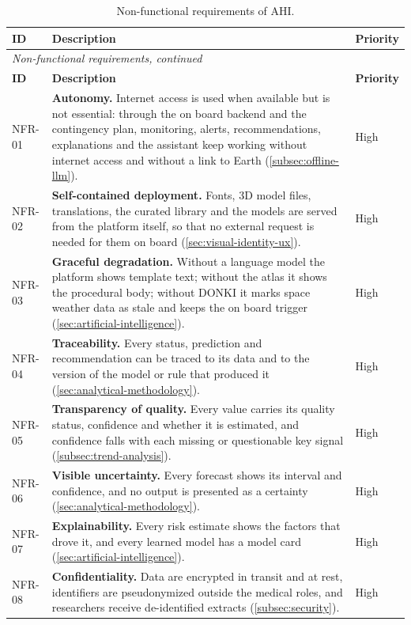 {\footnotesize
\begin{longtable}{p{1.5cm}p{10.8cm}p{1.5cm}}
\caption{Non-functional requirements of AHI.}
\label{tab:req-nonfunctional}\\
\hline
\textbf{ID} & \textbf{Description} & \textbf{Priority} \\
\hline
\endfirsthead
\multicolumn{3}{l}{\textit{Non-functional requirements, continued}} \\
\hline
\textbf{ID} & \textbf{Description} & \textbf{Priority} \\
\hline
\endhead
\hline
\endfoot
\hline
\endlastfoot
NFR-01 & \textbf{Autonomy.} Internet access is used when available but is not essential: through the on board backend and the contingency plan, monitoring, alerts, recommendations, explanations and the assistant keep working without internet access and without a link to Earth (\ref{subsec:offline-llm}). & High \\
NFR-02 & \textbf{Self-contained deployment.} Fonts, 3D model files, translations, the curated library and the models are served from the platform itself, so that no external request is needed for them on board (\ref{sec:visual-identity-ux}). & High \\
NFR-03 & \textbf{Graceful degradation.} Without a language model the platform shows template text; without the atlas it shows the procedural body; without DONKI it marks space weather data as stale and keeps the on board trigger (\ref{sec:artificial-intelligence}). & High \\
NFR-04 & \textbf{Traceability.} Every status, prediction and recommendation can be traced to its data and to the version of the model or rule that produced it (\ref{sec:analytical-methodology}). & High \\
NFR-05 & \textbf{Transparency of quality.} Every value carries its quality status, confidence and whether it is estimated, and confidence falls with each missing or questionable key signal (\ref{subsec:trend-analysis}). & High \\
NFR-06 & \textbf{Visible uncertainty.} Every forecast shows its interval and confidence, and no output is presented as a certainty (\ref{sec:analytical-methodology}). & High \\
NFR-07 & \textbf{Explainability.} Every risk estimate shows the factors that drove it, and every learned model has a model card (\ref{sec:artificial-intelligence}). & High \\
NFR-08 & \textbf{Confidentiality.} Data are encrypted in transit and at rest, identifiers are pseudonymized outside the medical roles, and researchers receive de-identified extracts (\ref{subsec:security}). & High \\

\end{longtable}}
